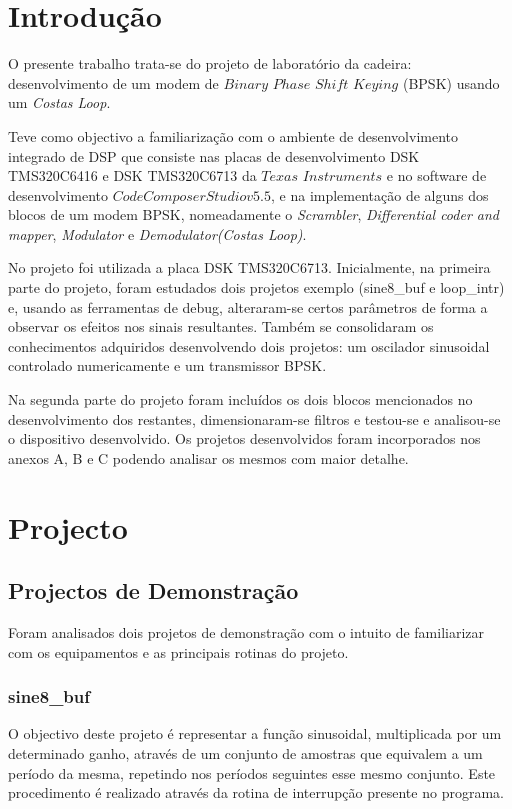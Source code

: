 \documentclass[11pt]{article}
\numberwithin{equation}{section}
\begin{document}
	\clearpage
	
	\section{Introdução}
	O presente trabalho trata-se do projeto de laboratório da cadeira: desenvolvimento de um modem de $Binary$ $Phase$ $Shift$ $Keying$ (BPSK) usando um \textit{Costas Loop}. 
	
	Teve como objectivo a familiarização com o ambiente de desenvolvimento integrado de DSP que consiste nas placas de desenvolvimento DSK TMS320C6416 e DSK TMS320C6713 da $Texas$ $Instruments$ e no software de desenvolvimento $Code Composer Studio v5.5$, e na implementação de alguns dos blocos de um modem BPSK, nomeadamente o \textit{Scrambler},  \textit{Differential coder and mapper}, \textit{Modulator} e \textit{Demodulator(Costas Loop)}.
	
	No projeto foi utilizada a placa DSK TMS320C6713. Inicialmente, na primeira parte do projeto, foram estudados dois projetos exemplo (sine8\_buf e loop\_intr) e, usando as ferramentas de debug, alteraram-se certos parâmetros de forma a observar os efeitos nos sinais resultantes. Também se consolidaram os conhecimentos adquiridos desenvolvendo dois projetos: um oscilador sinusoidal controlado numericamente e um transmissor BPSK. 
	
	Na segunda parte do projeto foram incluídos os dois blocos mencionados no desenvolvimento dos restantes, dimensionaram-se filtros e testou-se e analisou-se o dispositivo desenvolvido. Os projetos desenvolvidos foram incorporados nos anexos A, B e C podendo analisar os mesmos com maior detalhe.
	
	\section{Projecto}
	
	\subsection{Projectos de Demonstração}
	Foram analisados dois projetos de demonstração com o intuito de familiarizar com os equipamentos e as principais rotinas do projeto.
	\subsubsection{sine8\_buf}
	\label{sec:sine8}
	O objectivo deste projeto é representar a função sinusoidal, multiplicada por um determinado ganho, através de um conjunto de amostras que equivalem a um período da mesma, repetindo nos períodos seguintes esse mesmo conjunto. Este procedimento é realizado através da rotina de interrupção presente no programa. 
	
\end{document}
